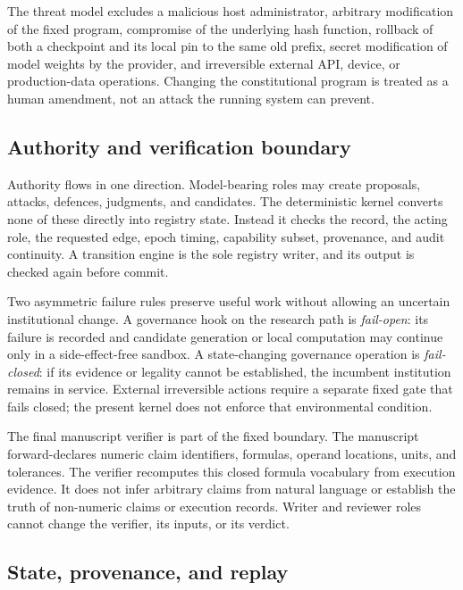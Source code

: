 The threat model excludes a malicious host administrator, arbitrary
modification of the fixed program, compromise of the underlying hash
function, rollback of both a checkpoint and its local pin to the same old
prefix, secret modification of model weights by the provider, and
irreversible external API, device, or production-data operations.
Changing the constitutional program is treated as a human amendment, not
an attack the running system can prevent.

\subsection{Authority and verification boundary}\label{sec:overview:verification}

Authority flows in one direction. Model-bearing roles may create
proposals, attacks, defences, judgments, and candidates. The deterministic
kernel converts none of these directly into registry state. Instead it
checks the record, the acting role, the requested edge, epoch timing,
capability subset, provenance, and audit continuity. A transition engine
is the sole registry writer, and its output is checked again before
commit.

Two asymmetric failure rules preserve useful work without allowing an
uncertain institutional change. A governance hook on the research path is
\emph{fail-open}: its failure is recorded and candidate generation or
local computation may continue only in a side-effect-free sandbox. A
state-changing governance operation is \emph{fail-closed}: if its evidence
or legality cannot be established, the incumbent institution remains in
service. External irreversible actions require a separate fixed gate that
fails closed; the present kernel does not enforce that environmental
condition.

The final manuscript verifier is part of the fixed boundary. The
manuscript forward-declares numeric claim identifiers, formulas, operand
locations, units, and tolerances. The verifier recomputes this closed
formula vocabulary from execution evidence. It does not infer arbitrary
claims from natural language or establish the truth of non-numeric claims
or execution records. Writer and reviewer roles cannot change the
verifier, its inputs, or its verdict.

\subsection{State, provenance, and replay}\label{sec:overview:checkpoint}

